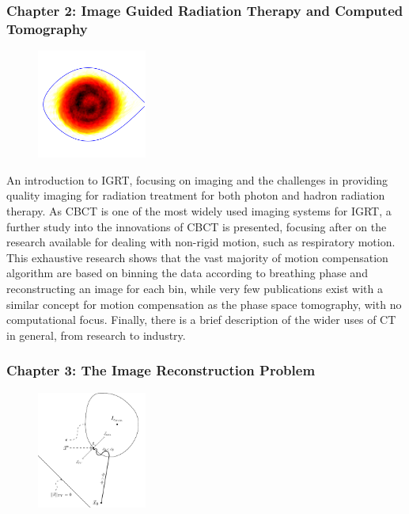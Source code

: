 \subsubsection{Chapter 2: Image Guided Radiation Therapy and Computed Tomography}


\begin{figure}
\centering
\includegraphics[width=0.32\textwidth]{StateOfArt/pst.png}
\end{figure}

An introduction to IGRT, focusing on imaging and the challenges in providing quality imaging for radiation treatment for both photon and hadron radiation therapy. As CBCT is one of the most widely used imaging systems for IGRT, a further study into the innovations of CBCT is presented, focusing after on the research available for dealing with non-rigid motion, such as respiratory motion. This exhaustive research shows that the vast majority of motion compensation algorithm are based on binning the data according to breathing phase and reconstructing an image for each bin, while very few publications exist with a similar concept for motion compensation as the phase space tomography, with no computational focus. Finally, there is a brief description of the wider uses of CT in general, from research to industry.

\vspace{40pt}
\subsubsection{Chapter 3: The Image Reconstruction Problem}

\begin{figure}
\centering
\includegraphics[width=0.32\textwidth]{RecAlgorithms/POCS.pdf}
\end{figure}

